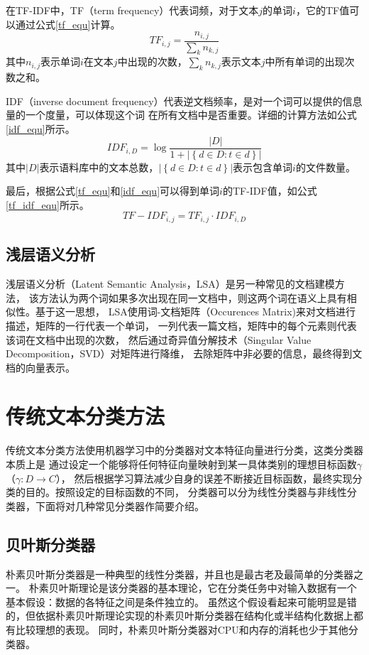 \documentclass{standalone}
\begin{document}
在TF-IDF中，TF（term frequency）代表词频，对于文本$j$的单词$i$，它的TF值可以通过公式\ref{tf_equ}计算。
\begin{equation}
    TF_{i,j}=\frac{n_{i,j}}{\sum_k n_{k,j}}
    \label{tf_equ}
\end{equation}
其中$n_{i,j}$表示单词$i$在文本$j$中出现的次数，$\sum_k n_{k,j}$表示文本$j$中所有单词的出现次数之和。

IDF（inverse document frequency）代表逆文档频率，是对一个词可以提供的信息量的一个度量，可以体现这个词
在所有文档中是否重要。详细的计算方法如公式\ref{idf_equ}所示。
\begin{equation}
    IDF_{i,D}=\log \frac{\left | D \right |}{1+\left | \left \{ d\in D:t\in d \right \} \right |}
    \label{idf_equ}
\end{equation}
其中$\left | D \right |$表示语料库中的文本总数，$\left | \left \{ d\in D:t\in d \right \} \right |$表示包含单词$i$的文件数量。

最后，根据公式\ref{tf_equ}和\ref{idf_equ}可以得到单词$i$的TF-IDF值，如公式\ref{tf_idf_equ}所示。
\begin{equation}
    TF-IDF_{i,j}=TF_{i,j} \cdot IDF_{i,D}
    \label{tf_idf_equ}
\end{equation}

\subsection{浅层语义分析}
浅层语义分析（Latent Semantic Analysis，LSA）是另一种常见的文档建模方法，
该方法认为两个词如果多次出现在同一文档中，则这两个词在语义上具有相似性。基于这一思想，
LSA使用词-文档矩阵（Occurences Matrix)来对文档进行描述，矩阵的一行代表一个单词，
一列代表一篇文档，矩阵中的每个元素则代表该词在文档中出现的次数，
然后通过奇异值分解技术（Singular Value Decomposition，SVD）对矩阵进行降维，
去除矩阵中非必要的信息，最终得到文档的向量表示。


\section{传统文本分类方法}
传统文本分类方法使用机器学习中的分类器对文本特征向量进行分类，这类分类器本质上是
通过设定一个能够将任何特征向量映射到某一具体类别的理想目标函数$\gamma$（$\gamma :D\rightarrow C$），
然后根据学习算法减少自身的误差不断接近目标函数，最终实现分类的目的。按照设定的目标函数的不同，
分类器可以分为线性分类器与非线性分类器，下面将对几种常见分类器作简要介绍。
\subsection{贝叶斯分类器}
朴素贝叶斯分类器是一种典型的线性分类器，并且也是最古老及最简单的分类器之一。
朴素贝叶斯理论是该分类器的基本理论，它在分类任务中对输入数据有一个基本假设：数据的各特征之间是条件独立的。
虽然这个假设看起来可能明显是错的，但依据朴素贝叶斯理论实现的朴素贝叶斯分类器在结构化或半结构化数据上都有比较理想的表现。
同时，朴素贝叶斯分类器对CPU和内存的消耗也少于其他分类器。
\end{document}
